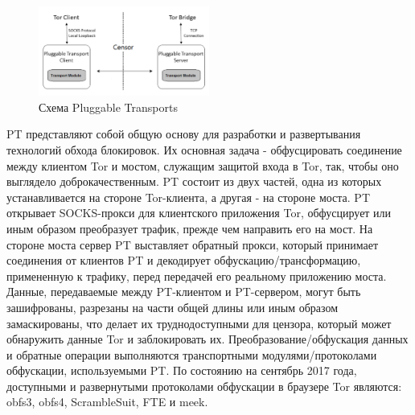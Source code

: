 \begin{figure}[h!]
    \begin{center}
        \includegraphics[width = 0.5\textwidth]{tor_pt.png}
        \caption{Схема Pluggable Transports}
        \label{spectrum}
    \end{center}
\end{figure}

PT представляют собой общую основу для разработки и развертывания технологий обхода блокировок.
Их основная задача - обфусцировать соединение между клиентом Tor и мостом, служащим защитой входа в Tor, так, чтобы оно выглядело доброкачественным.
PT состоит из двух частей, одна из которых устанавливается на стороне Tor-клиента, а другая - на стороне моста.
PT открывает SOCKS-прокси для клиентского приложения Tor, обфусцирует или иным образом преобразует трафик, прежде чем направить его на мост.
На стороне моста сервер PT выставляет обратный прокси, который принимает соединения от клиентов PT и декодирует обфускацию/трансформацию,
примененную к трафику, перед передачей его реальному приложению моста.
Данные, передаваемые между PT-клиентом и PT-сервером, могут быть зашифрованы, разрезаны на части общей длины или иным образом замаскированы,
что делает их труднодоступными для цензора, который может обнаружить данные Tor и заблокировать их.
Преобразование/обфускация данных и обратные операции выполняются транспортными модулями/протоколами обфускации, используемыми PT.
По состоянию на сентябрь 2017 года, доступными и развернутыми протоколами обфускации в браузере Tor являются: obfs3, obfs4, ScrambleSuit, FTE и meek.

